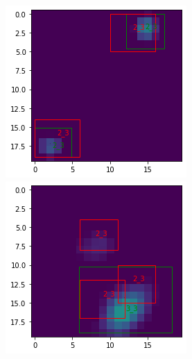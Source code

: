 \documentclass[a4paper,10pt]{report}
\begin{document}
\begin{figure}[!htb]
    \includegraphics[width=\linewidth]{b16_8769_16616_17279_20.png}
  \endminipage\hfill
    \includegraphics[width=\linewidth]{b16_14003_16486_17609_20.png}
  \endminipage\hfill

\end{figure}
\end{document}
